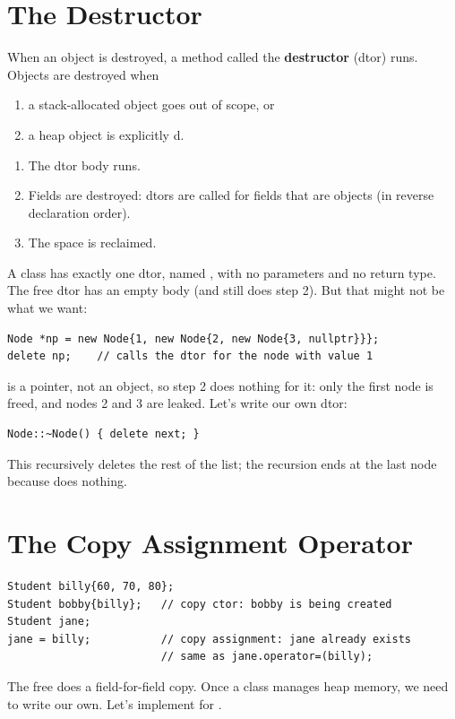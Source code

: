 \section{The Destructor}
When an object is destroyed, a method called the \textbf{destructor} (dtor)
runs. Objects are destroyed when
\begin{enumerate}
  \item a stack-allocated object goes out of scope, or
  \item a heap object is explicitly d.
\end{enumerate}

\begin{important}
\begin{enumerate}
  \item The dtor body runs.
  \item Fields are destroyed: dtors are called for fields that are objects (in
        reverse declaration order).
  \item The space is reclaimed.
\end{enumerate}
\end{important}

A class has exactly one dtor, named , with no
parameters and no return type. The free dtor has an empty body (and still does
step 2). But that might not be what we want:
\begin{lstlisting}[style=cpp]
Node *np = new Node{1, new Node{2, new Node{3, nullptr}}};
delete np;    // calls the dtor for the node with value 1
\end{lstlisting}
 is a pointer, not an object, so step 2 does nothing for it: only the
first node is freed, and nodes 2 and 3 are leaked. Let's write our own dtor:
\begin{lstlisting}[style=cpp]
Node::~Node() { delete next; }
\end{lstlisting}
This recursively deletes the rest of the list; the recursion ends at the last
node because  does nothing.

\section{The Copy Assignment Operator}
\begin{lstlisting}[style=cpp]
Student billy{60, 70, 80};
Student bobby{billy};   // copy ctor: bobby is being created
Student jane;
jane = billy;           // copy assignment: jane already exists
                        // same as jane.operator=(billy);
\end{lstlisting}
The free  does a field-for-field copy. Once a class manages heap
memory, we need to write our own. Let's implement  for
.

